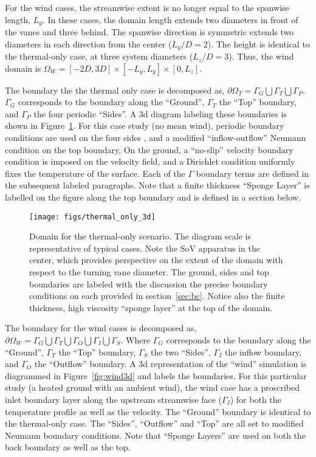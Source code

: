 For the wind cases, the streamwise extent is no longer equal to
the spanwise length, $L_y$. In these cases, the domain length extends
two diameters in front of the vanes and three behind. The
spanwise direction is symmetric extends two diameters in each direction 
from the center ($L_y/D = 2$). The height is identical to the thermal-only case, at
three system diameters ($L_z/D = 3$). Thus, the wind domain is 
$\Omega_W = \left[-2D,3D \right] \times \left[-L_y,L_y \right] \times \left[0,L_z \right]$. 

The boundary the the thermal only case is decomposed as,
$\partial \Omega_T = \Gamma_G \bigcup \Gamma_T \bigcup \Gamma_P $. 
$\Gamma_G$ corresponds to the boundary along the ``Ground'', $\Gamma_T$ the ``Top'' boundary,
and $\Gamma_P$ the four periodic ``Sides''. A 3d diagram labeling these boundaries is shown in
Figure~\ref{fig:thermal3d}. For this case study (no mean wind), 
periodic boundary conditions are used on the four sides , and a modified
``inflow-outflow'' Neumann condition\cite{gunzburger1989finite} on the
top boundary, On the ground, a ``no-slip'' velocity boundary condition is
imposed on the velocity field, and a Dirichlet condition uniformly fixes
the temperature of the surface. 
Each of the $\Gamma$ boundary terms are defined in the subsequent labeled paragraphs.  
Note that a finite thickness ``Sponge Layer'' is labelled on the figure along 
the top boundary and is defined in a section below.

\begin{figure}[!htb]
  \begin{center}
    \texttt{[image: figs/thermal\_only\_3d]}
    \caption{Domain for the thermal-only
   scenario. The diagram scale is representative of typical cases. Note
   the SoV apparatus in the center, which provides perspective on the
   extent of the domain with respect to the turning vane diameter. The
   ground, sides and top boundaries are labeled with the discussion the
   precise boundary conditions on each provided in
   section~\ref{sec:bc}. Notice also the finite thickness, high
   viscosity ``sponge layer'' at the top of the domain.} 
    \label{fig:thermal3d}
  \end{center}
\end{figure}

The boundary for the wind cases is decomposed as,
$\partial \Omega_W = \Gamma_G \bigcup \Gamma_T \bigcup \Gamma_O \bigcup \Gamma_I \bigcup \Gamma_S $. 
Where $\Gamma_G$ corresponds to the boundary along the ``Ground'', $\Gamma_T$ the ``Top'' boundary, 
$\Gamma_S$ the two ``Sides'', $\Gamma_I$ the inflow boundary, and $\Gamma_O$ the ``Outflow'' 
boundary.
A 3d representation of the ``wind'' simulation is diagrammed in
Figure~\ref{fig:wind3d} and labels the boundaries. 
For this particular study (a heated ground with 
an ambient wind), the wind case has a proscribed inlet boundary layer along the 
upstream streamwise face ($\Gamma_I$)
for both the temperature profile as well as the velocity. The ``Ground''
boundary is identical to the thermal-only case. The ``Sides'', ``Outflow'' and
``Top'' are all set to modified Neumann boundary conditions. 
Note that ``Sponge Layers'' are used on both the back boundary as well as the top.

